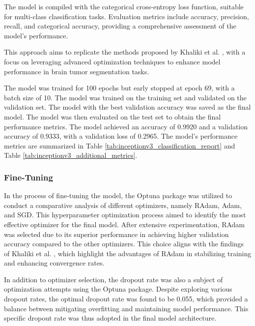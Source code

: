The model is compiled with the categorical cross-entropy loss function, suitable for multi-class classification tasks. Evaluation metrics include accuracy, precision, recall, and categorical accuracy, providing a comprehensive assessment of the model's performance.

This approach aims to replicate the methods proposed by Khaliki et al. \cite{khaliki_brain_2024}, with a focus on leveraging advanced optimization techniques to enhance model performance in brain tumor segmentation tasks.

%
The model was trained for 100 epochs but early stopped at epoch 69, with a batch size of 10. The model was trained on the training set and validated on the validation set. The model with the best validation accuracy was saved as the final model. The model was then evaluated on the test set to obtain the final performance metrics. The model achieved an accuracy of 0.9920 and a validation accuracy of 0.9333, with a validation loss of 0.2965. The model's performance metrics are summarized in Table \ref{tab:inceptionv3_classification_report} and Table \ref{tab:inceptionv3_additional_metrics}.

\subsubsection{Fine-Tuning}

In the process of fine-tuning the model, the Optuna package was utilized to conduct a comparative analysis of different optimizers, namely RAdam, Adam, and SGD. This hyperparameter optimization process aimed to identify the most effective optimizer for the final model. After extensive experimentation, RAdam was selected due to its superior performance in achieving higher validation accuracy compared to the other optimizers. This choice aligns with the findings of Khaliki et al. \cite{khaliki_brain_2024}, which highlight the advantages of RAdam in stabilizing training and enhancing convergence rates.

In addition to optimizer selection, the dropout rate was also a subject of optimization attempts using the Optuna package. Despite exploring various dropout rates, the optimal dropout rate was found to be 0.055, which provided a balance between mitigating overfitting and maintaining model performance. This specific dropout rate was thus adopted in the final model architecture.

